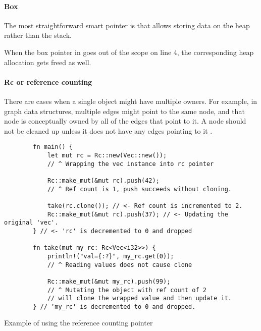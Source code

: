 \paragraph{Box}
The most straightforward smart pointer is  that allows storing data on the heap rather than the stack.

When the box pointer in  goes out of the scope on line 4, the corresponding heap allocation gets freed as well.

\paragraph{Rc or reference counting}
There are cases when a single object might have multiple owners. For example, in graph data structures, multiple edges might point to the same node, and that node is conceptually owned by all of the edges that point to it. A node should not be cleaned up unless it does not have any edges pointing to it \cite{rust-book-2e}.

\begin{listing}[!ht]

    \centering
    \begin{verbatim}
        fn main() {
            let mut rc = Rc::new(Vec::new());
            // ^ Wrapping the vec instance into rc pointer

            Rc::make_mut(&mut rc).push(42);
            // ^ Ref count is 1, push succeeds without cloning.

            take(rc.clone()); // <- Ref count is incremented to 2.
            Rc::make_mut(&mut rc).push(37); // <- Updating the original 'vec'.
        } // <- 'rc' is decremented to 0 and dropped

        fn take(mut my_rc: Rc<Vec<i32>>) {
            println!("val={:?}", my_rc.get(0));
            // ^ Reading values does not cause clone

            Rc::make_mut(&mut my_rc).push(99);
            // ^ Mutating the object with ref count of 2
            // will clone the wrapped value and then update it.
        } // ‘my_rc' is decremented to 0 and dropped.
    \end{verbatim}

    \caption{Example of using the reference counting pointer}
    \label{lst:rc}
\end{listing}

